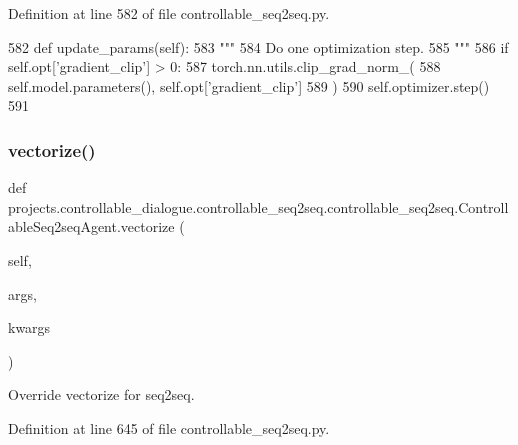 Definition at line 582 of file controllable\+\_\+seq2seq.\+py.


\begin{DoxyCode}
582     \textcolor{keyword}{def }update\_params(self):
583         \textcolor{stringliteral}{"""}
584 \textcolor{stringliteral}{        Do one optimization step.}
585 \textcolor{stringliteral}{        """}
586         \textcolor{keywordflow}{if} self.opt[\textcolor{stringliteral}{'gradient\_clip'}] > 0:
587             torch.nn.utils.clip\_grad\_norm\_(
588                 self.model.parameters(), self.opt[\textcolor{stringliteral}{'gradient\_clip'}]
589             )
590         self.optimizer.step()
591 
\end{DoxyCode}
\mbox{\label{classprojects_1_1controllable__dialogue_1_1controllable__seq2seq_1_1controllable__seq2seq_1_1ControllableSeq2seqAgent_aae1b61b5d838205753a872e34e0c8c34}} 
\subsubsection{\texorpdfstring{vectorize()}{vectorize()}}
{\footnotesize\ttfamily def projects.\+controllable\+\_\+dialogue.\+controllable\+\_\+seq2seq.\+controllable\+\_\+seq2seq.\+Controllable\+Seq2seq\+Agent.\+vectorize (\begin{DoxyParamCaption}\item[{}]{self,  }\item[{}]{args,  }\item[{}]{kwargs }\end{DoxyParamCaption})}

\begin{DoxyVerb}Override vectorize for seq2seq.
\end{DoxyVerb}
 

Definition at line 645 of file controllable\+\_\+seq2seq.\+py.


